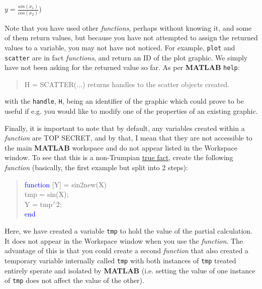 \documentclass{tufte-book} %
\newenvironment{docspec}{\begin{quotation}\ttfamily\parskip0pt\parindent0pt\ignorespaces}{\end{quotation}}
\begin{document}
\vspace{2mm}
\(y = \frac{sin(x_1)}{cos(x_2)}\))
\vspace{2mm}

Note that you have used other \textit{functions}, perhaps without knowing it, and some of them return values, but because you have not attempted to assign the returned values to a variable, you may not have not noticed. For example, \texttt{plot} and \texttt{scatter} are in fact \textit{functions}, and return an ID of the plot graphic. We simply have not been asking for the returned value so far. As per \textbf{MATLAB} \texttt{help}:
\begin{docspec}
H = SCATTER(...) returns handles to the scatter objects created.
\end{docspec}
with the \texttt{handle}, \texttt{H}, being an identifier of the graphic which could prove to be useful if  e.g. you would like to modify  one of the properties of an existing graphic.


Finally, it is important to note that by default, any variables created within a \textit{function} are TOP SECRET, and by that, I mean that they are not accessible to the main \textbf{MATLAB} workspace and do not appear listed in the \textsf{Workspace window}. To see that this is a non-Trumpian \uline{true fact}, create the following \textit{function} (basically, the first example but split into 2 steps):
\begin{docspec}
\textcolor{blue}{function} [Y] = sin2new(X)
\\tmp = sin(X);
\\Y = tmp\(^{\wedge}\)2; 
\\\textcolor{blue}{end}
\end{docspec}
\noindent Here, we have created a variable \texttt{tmp} to hold the value of the partial calculation. It does not appear in the \textsf{Workspace window} when you use the \textit{function}. The advantage of this is that you could create a second \textit{function} that also created a temporary variable internally called \texttt{tmp} with both instances of \texttt{tmp} treated entirely sperate and isolated by \textbf{MATLAB} (i.e. setting the value of one instance of \texttt{tmp} does not affect the value of the other).
\end{document}
